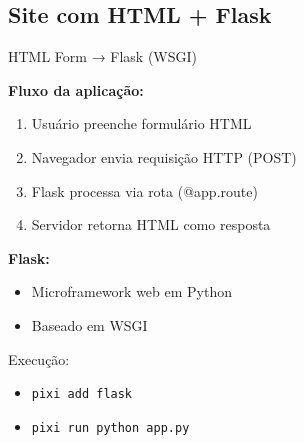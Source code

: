 \documentclass{beamer}
\begin{document}
\subsection{Site com HTML + Flask}
\begin{frame}{HTML Form → Flask (WSGI)}
    
    \textbf{Fluxo da aplicação:}
    
    \begin{enumerate}
        \item Usuário preenche formulário HTML
        \item Navegador envia requisição HTTP (POST)
        \item Flask processa via rota (@app.route)
        \item Servidor retorna HTML como resposta
    \end{enumerate}
    
    \vspace{0.4cm}
    
    \textbf{Flask:}
    \begin{itemize}
        \item Microframework web em Python
        \item Baseado em WSGI
    \end{itemize}
    
    \vspace{0.4cm}
    
    Execução:
    \begin{itemize}
        \item \texttt{pixi add flask}
        \item \texttt{pixi run python app.py}
    \end{itemize}
    
\end{frame}
\end{document}
